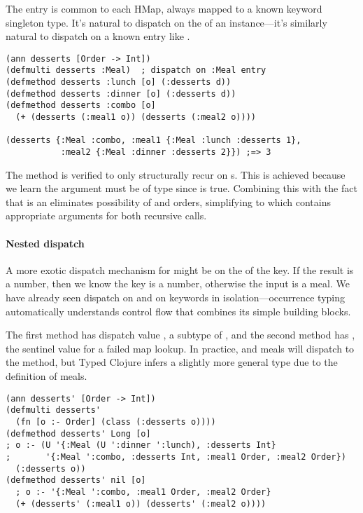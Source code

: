 The  entry is common to each HMap, always mapped to a known keyword singleton
type.
It's natural to dispatch on the  of an instance---it's similarly
natural to dispatch on a known entry like .
%
\begin{exmp2} %
\begin{lstlisting}
(ann desserts [Order -> Int])
(defmulti desserts :Meal)  ; dispatch on :Meal entry
(defmethod desserts :lunch [o] (:desserts d))
(defmethod desserts :dinner [o] (:desserts d))
(defmethod desserts :combo [o] 
  (+ (desserts (:meal1 o)) (desserts (:meal2 o))))

(desserts {:Meal :combo, :meal1 {:Meal :lunch :desserts 1}, 
           :meal2 {:Meal :dinner :desserts 2}}) ;=> 3
\end{lstlisting}
\label{example:desserts-on-meal}
\end{exmp2}
%
The  method is verified to only structurally recur
on s. This is achieved because we learn the argument  must
be of type
since
is true. Combining this
with the fact that  is an 
eliminates possibility of  and 
orders, simplifying  to
which contains appropriate arguments for both recursive calls.

\paragraph{Nested dispatch}
A more exotic dispatch mechanism for 
might be on the  of the  key.
If the result is a number, then we know the 
key is a number, otherwise the input is a  meal.
We have already seen dispatch on  and on keywords
in isolation---occurrence typing automatically understands
control flow that combines its simple building blocks.

The first method has dispatch value , a subtype
of , and the second method has , the sentinel value for a failed map lookup.
In practice,  and  meals will dispatch to the 
method, but Typed Clojure infers a slightly more general type due to the definition
of  meals.

\begin{exmp}
\begin{lstlisting}
(ann desserts' [Order -> Int])
(defmulti desserts' 
  (fn [o :- Order] (class (:desserts o))))
(defmethod desserts' Long [o] 
; o :- (U '{:Meal (U ':dinner ':lunch), :desserts Int}
;       '{:Meal ':combo, :desserts Int, :meal1 Order, :meal2 Order})
  (:desserts o))
(defmethod desserts' nil [o]
  ; o :- '{:Meal ':combo, :meal1 Order, :meal2 Order}
  (+ (desserts' (:meal1 o)) (desserts' (:meal2 o))))
\end{lstlisting}
\label{example:desserts-on-class}
\end{exmp}
%

